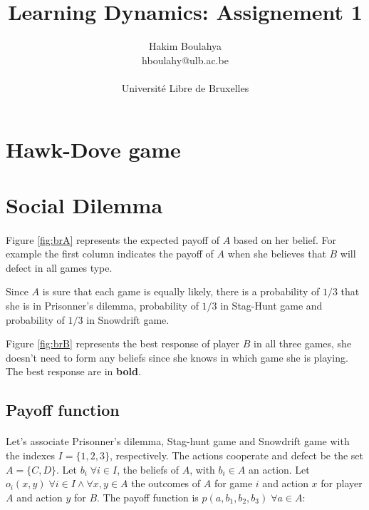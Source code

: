 \documentclass[letterpaper]{article}
\title{Learning Dynamics: Assignement 1}
\author{\Large Hakim Boulahya \\
hboulahy@ulb.ac.be\\
\\
Université Libre de Bruxelles
}
\begin{document}
\maketitle


\section{Hawk-Dove game}

\section{Social Dilemma}

\paragraph{}

Figure \ref{fig:brA} represents the expected payoff of $A$ based on her
belief. For example the first column indicates the payoff of $A$ when she
believes that $B$ will defect in all games type.

Since $A$ is sure that each game is equally likely, there is a probability of
$1/3$ that she is in Prisonner's dilemma,
probability of $1/3$ in Stag-Hunt game and probability of $1/3$ in Snowdrift
game.

Figure \ref{fig:brB} represents the best response of player $B$ in all three
games, she doesn't need to form any beliefs since she knows in which game
she is playing. The best response are in \textbf{bold}.

\subsection{Payoff function}

\paragraph{}

Let's associate Prisonner's dilemma, Stag-hunt game and Snowdrift game with
the indexes $I = \{1, 2, 3\}$, respectively. The actions
cooperate and defect be the set $A = \{C, D\}$. Let $b_i \; \forall i \in I$,
the beliefs of $A$, with $b_i \in A$ an action.
Let $o_i(x, y) \; \forall i \in I \wedge
\forall x,y \in A$ the outcomes of $A$ for game $i$ and action $x$ for
player $A$ and action $y$ for $B$. The
payoff function is $p(a, b_1, b_2, b_3) \; \forall a \in A$:
\end{document}

